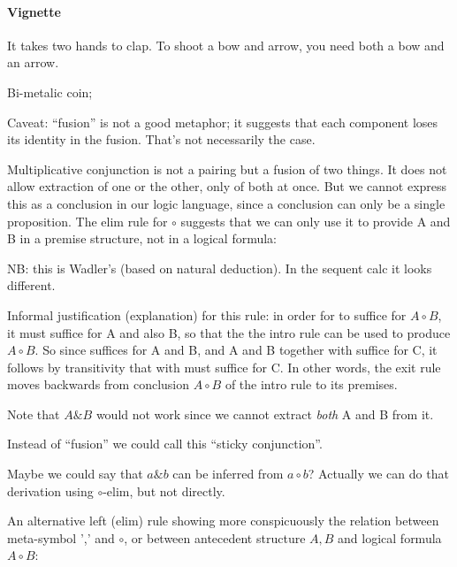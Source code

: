 \documentclass{article}
\begin{document}
\paragraph{Vignette\\}

It takes two hands to clap. To shoot a bow and arrow, you need both a
bow and an arrow.

Bi-metalic coin;

Caveat: ``fusion'' is not a good metaphor; it suggests that each
component loses its identity in the fusion. That's not necessarily the
case.

Multiplicative conjunction is not a pairing but a fusion of two
things. It does not allow extraction of one or the other, only of both
at once. But we cannot express this as a conclusion in our logic
language, since a conclusion can only be a single proposition. The
elim rule for \(\circ\) suggests that we can only use it to provide A
and B in a premise structure, not in a logical formula:


NB: this is Wadler's (based on natural deduction). In the sequent calc
it looks different.

Informal justification (explanation) for this rule: in order for
\ContextG to suffice for \(A\circ B\), it must suffice for A and also
B, so that the the intro rule can be used to produce \(A\circ B\). So
since \ContextG suffices for A and B, and A and B together with
\ContextD suffice for C, it follows by transitivity that \ContextG
with \ContextD must suffice for C. In other words, the exit rule moves
backwards from conclusion \(A\circ B\) of the intro rule to its
premises.

Note that \(A\&B\) would not work since we cannot extract
\textit{both} A and B from it.

Instead of ``fusion'' we could call this ``sticky conjunction''.

Maybe we could say that \(a\&b\) can be inferred from
\(a\circ b\)? Actually we can do that derivation using \(\circ\)-elim,
but not directly.

An alternative left (elim) rule showing more conspicuously the
relation between meta-symbol ',' and \(\circ\), or between antecedent
structure \(A,B\) and logical formula \(A\circ B\):
\end{document}
